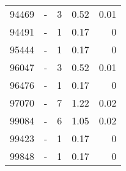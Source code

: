 \begin{longtable}{lXrrr}
        94469 & \multicolumn{1}{X}{-} & %
          \num{3} &
          \num[round-mode=places,round-precision=2]{0,52} &
          \num[round-mode=places,round-precision=2]{0,01} \\

        94491 & \multicolumn{1}{X}{-} & %
          \num{1} &
          \num[round-mode=places,round-precision=2]{0,17} &
          \num[round-mode=places,round-precision=2]{0} \\

        95444 & \multicolumn{1}{X}{-} & %
          \num{1} &
          \num[round-mode=places,round-precision=2]{0,17} &
          \num[round-mode=places,round-precision=2]{0} \\

        96047 & \multicolumn{1}{X}{-} & %
          \num{3} &
          \num[round-mode=places,round-precision=2]{0,52} &
          \num[round-mode=places,round-precision=2]{0,01} \\

        96476 & \multicolumn{1}{X}{-} & %
          \num{1} &
          \num[round-mode=places,round-precision=2]{0,17} &
          \num[round-mode=places,round-precision=2]{0} \\

        97070 & \multicolumn{1}{X}{-} & %
          \num{7} &
          \num[round-mode=places,round-precision=2]{1,22} &
          \num[round-mode=places,round-precision=2]{0,02} \\

        99084 & \multicolumn{1}{X}{-} & %
          \num{6} &
          \num[round-mode=places,round-precision=2]{1,05} &
          \num[round-mode=places,round-precision=2]{0,02} \\

        99423 & \multicolumn{1}{X}{-} & %
          \num{1} &
          \num[round-mode=places,round-precision=2]{0,17} &
          \num[round-mode=places,round-precision=2]{0} \\

        99848 & \multicolumn{1}{X}{-} & %
          \num{1} &
          \num[round-mode=places,round-precision=2]{0,17} &
          \num[round-mode=places,round-precision=2]{0} \\


\end{longtable}
